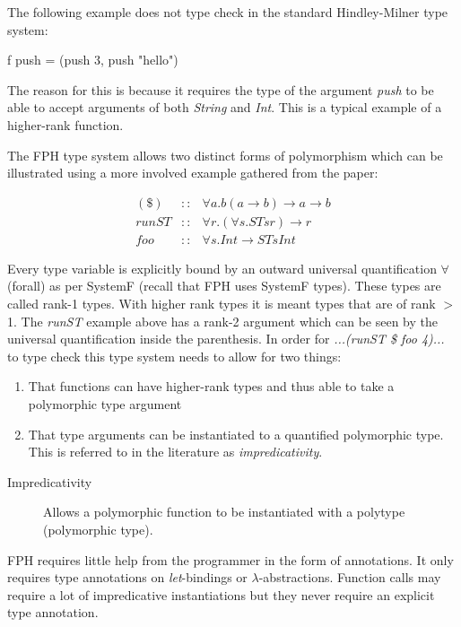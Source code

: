 The following example does not type check in the standard Hindley-Milner type system:
\begin{code}
f push = (push 3, push "hello")
\end{code}

The reason for this is because it requires the type of the argument \textit{push} to be able to accept arguments of both \textit{String} and \textit{Int}. This is a typical example of a higher-rank function. 

The FPH type system allows two distinct forms of polymorphism which can be illustrated using a more involved example gathered from the paper\cite{FPH}:

\begin{eqnarray*}
(\$)  &::& \forall a. b (a\rightarrow b) \rightarrow a \rightarrow b\\
runST &::& \forall r. (\forall s. ST s r) \rightarrow r\\
foo   &::& \forall s. Int \rightarrow ST s Int
\end{eqnarray*}

Every type variable is explicitly bound by an outward universal quantification $\forall$ (forall) as per SystemF (recall that FPH uses SystemF types). These types are called rank-1 types. With higher rank types it is meant types that are of rank $>$ 1.
The \textit{runST} example above has a rank-2 argument which can be seen by the universal quantification inside the parenthesis.
In order for \textit{...(runST \$ foo 4)...} to type check this type system needs to allow for two things:
\begin{enumerate}
\item That functions can have higher-rank types and thus able to take a polymorphic type argument
\item That type arguments can be instantiated to a quantified polymorphic type. This is referred to in the literature as \textit{impredicativity}.
\end{enumerate}

\begin{description}
\item[Impredicativity] Allows a polymorphic function to be instantiated with a polytype (polymorphic type). 
\end{description}

FPH requires little help from the programmer in the form of annotations. It only requires type annotations on \textit{let}-bindings or $\lambda$-abstractions. Function calls may require a lot of impredicative instantiations but they never require an explicit type annotation.

